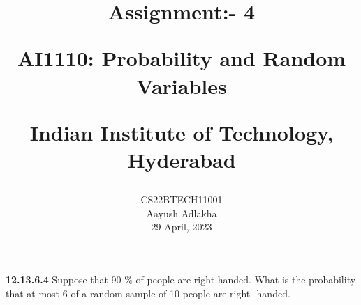 \documentclass[journal,12pt,twocolumn]{IEEEtran}
\begin{document}
\let\vec\mathbf


\vspace{3cm}

\title{
	Assignment:- 4
 
	\Large AI1110: Probability and Random Variables
 
	\Large Indian Institute of Technology, Hyderabad
}
\author{
	CS22BTECH11001
	
	Aayush Adlakha
 
	29 April, 2023
}






\maketitle

\newpage


\bigskip
\renewcommand{\thefigure}{\theenumi}
\renewcommand{\thetable}{\theenumi}
\textbf{12.13.6.4}
Suppose that 90 \% of people are right handed. What is the probability that
at most 6 of a random sample of 10 people are right-
handed.
\end{document}

